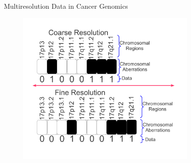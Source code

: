 \documentclass[first=orange,second=purple,logo=redexc]{aaltoslides}
\begin{document}
\begin{frame} {Multiresolution Data in Cancer Genomics} 


\begin{figure}
\centering
  \includegraphics[width=0.8\textwidth]{figures/data}
\end{figure}


\end{frame}

\end{document}
